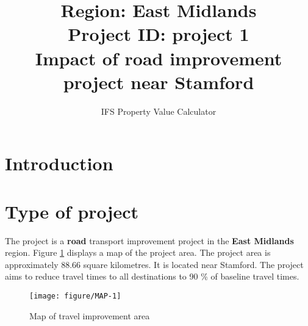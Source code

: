 \documentclass{article}\usepackage[]{graphicx}\usepackage[]{color}
\title{Region:   East Midlands \\
       Project ID:   project 1 \\
       Impact of road improvement project near Stamford }
\author{IFS Property Value Calculator}
\date{}
\newenvironment{knitrout}{}{} %
\begin{document}
\maketitle

\section{Introduction}

\section{Type of project}
The project is a \textbf{road} transport improvement project in the 
\textbf{East Midlands} region. Figure \ref{fig:MAP} displays a map of the project area.
The project area is approximately 88.66 square kilometres. It is located near
Stamford. The project aims to reduce travel times to all destinations to 90
\% of baseline travel times.

\begin{knitrout}\scriptsize
{}\color{fgcolor}\begin{figure}[H]

{\centering \texttt{[image: figure/MAP-1]} 

}

\caption[Map of travel improvement area]{Map of travel improvement area}\label{fig:MAP}
\end{figure}


\end{knitrout}
\end{document}
